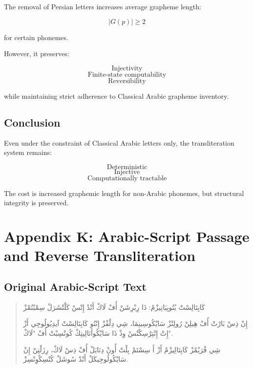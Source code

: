 \documentclass[12pt]{article}
\newcommand{\AR}[1]{\foreignlanguage{arabic}{#1}}
\begin{document}
The removal of Persian letters increases average grapheme length:

\[
|G(p)| \ge 2
\]

for certain phonemes.

However, it preserves:

\[
\text{Injectivity}
\]
\[
\text{Finite-state computability}
\]
\[
\text{Reversibility}
\]

while maintaining strict adherence to Classical Arabic grapheme inventory.

\subsection{Conclusion}

Even under the constraint of Classical Arabic letters only, the transliteration system remains:

\[
\text{Deterministic}
\]
\[
\text{Injective}
\]
\[
\text{Computationally tractable}
\]

The cost is increased graphemic length for non-Arabic phonemes, but structural integrity is preserved.

\section{Appendix K: Arabic-Script Passage and Reverse Transliteration}

\subsection{Original Arabic-Script Text}

\begin{quote}
\AR{كَابِتَالِسْتْ} \AR{يُتُوبِيَانِيزْمْ}: \AR{ذَا} \AR{رِبْرِشَنْ} \AR{أُفْ} \AR{لَاكْ} \AR{أَنْدْ} \AR{إِتْسْ} \AR{كَلْتْشَرَلْ} \AR{سِمْبْتُمْزْ}

\AR{إِنْ} \AR{ذِسْ} \AR{بَارْتْ} \AR{أُفْ} \AR{هِيلِنْ} \AR{رُولِنْزْ} \AR{سَايْكُوسِينِمَا،} \AR{شِي} \AR{دِلْفْزْ} \AR{إِنْتُو} \AR{كَابِتَالِسْتْ} \AR{آيدِيُولُوجِي} \AR{أَزْ} \AR{إِتْ} \AR{إِنْتِرْسِكْتْسْ} \AR{وِذْ} \AR{ذَا} \AR{سَايْكُوأَنَالِيتِكْ} \AR{كُونْسِبْتْ} \AR{أُفْ} "\AR{لَاكْ}".

\AR{شِي} \AR{فْرَيْمْزْ} \AR{كَابِتَالِيزْمْ} \AR{أَزْ} \AR{أَ} \AR{سِسْتَمْ} \AR{بِلْتْ} \AR{أُونْ} \AR{دِنَايَلْ} \AR{أُفْ} \AR{ذِسْ} \AR{لَاكْ،} \AR{رِزَلْتِنْ} \AR{إِنْ} \AR{سَايْكُولُوجِيكَلْ} \AR{أَنْدْ} \AR{سُوشَلْ} \AR{كُنْسِكْوِنْسِزْ}.
\end{quote}
\end{document}
